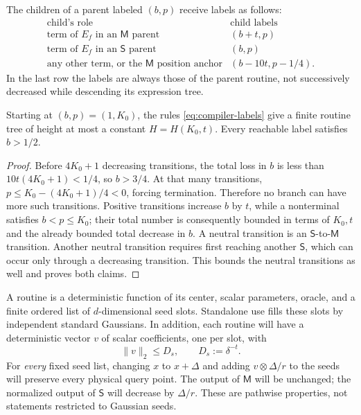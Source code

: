 The children of a parent labeled $(b,p)$ receive labels as follows:
\begin{equation}
 \begin{array}{c|c}
 \text{child's role}&\text{child labels}\\ \hline
 \text{term of }E_f\text{ in an }\mathsf M\text{ parent}&(b+t,p)\\
 \text{term of }E_f\text{ in an }\mathsf S\text{ parent}&(b,p)\\
 \text{any other term, or the }\mathsf M\text{ position anchor}
       &(b-10t,p-1/4).
 \end{array}
 \label{eq:compiler-labels}
\end{equation}
In the last row the labels are always those of the parent routine,
not successively decreased while descending its expression tree.

\begin{lemma}
\label{lem:compiler-height}
Starting at $(b,p)=(1,K_0)$, the rules
\eqref{eq:compiler-labels} give a finite routine tree of height at most
a constant $H=H(K_0,t)$.  Every reachable label satisfies $b>1/2$.
\end{lemma}
\begin{proof}
Before $4K_0+1$ decreasing transitions, the total loss in $b$ is less
than $10t(4K_0+1)<1/4$, so $b>3/4$.  At that many transitions,
$p\le K_0-(4K_0+1)/4<0$, forcing termination.  Therefore no branch
can have more such transitions.  Positive transitions increase $b$
by $t$, while a nonterminal satisfies $b<p\le K_0$; their total
number is consequently bounded in terms of $K_0,t$ and the already
bounded total decrease in $b$.  A neutral transition is an
$\mathsf S$-to-$\mathsf M$ transition.  Another neutral transition
requires first reaching another $\mathsf S$, which can occur only
through a decreasing transition.  This bounds the neutral transitions
as well and proves both claims.
\end{proof}

A routine is a deterministic function of its center, scalar
parameters, oracle, and a finite ordered list of $d$-dimensional seed
slots.  Standalone use fills these slots by independent standard
Gaussians.  In addition, each routine will have a deterministic vector
$v$ of scalar coefficients, one per slot, with
\begin{equation}
 \|v\|_2\le D_s,\qquad D_s:=\delta^{-t}.
 \label{eq:shift-budget}
\end{equation}
For \emph{every} fixed seed list, changing $x$ to $x+\Delta$ and
adding $v\otimes\Delta/r$ to the seeds will preserve every physical
query point.  The output of $\mathsf M$ will be unchanged; the
normalized output of $\mathsf S$ will decrease by $\Delta/r$.
These are pathwise properties, not statements restricted to Gaussian
seeds.

